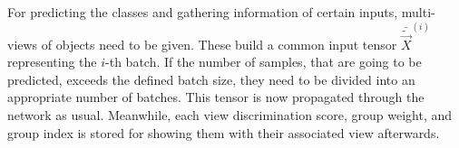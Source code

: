 For predicting the classes and gathering information of certain inputs, multi-views of objects need to be given.
These build a common input tensor $\bar{\tilde{\vec{X}}}^{(i)}$ representing the $i$-th batch.
If the number of samples, that are going to be predicted, exceeds the defined batch size, they need to be divided into an appropriate number of batches.
This tensor is now propagated through the network as usual.
Meanwhile, each view discrimination score, group weight, and group index is stored for showing them with their associated view afterwards.
